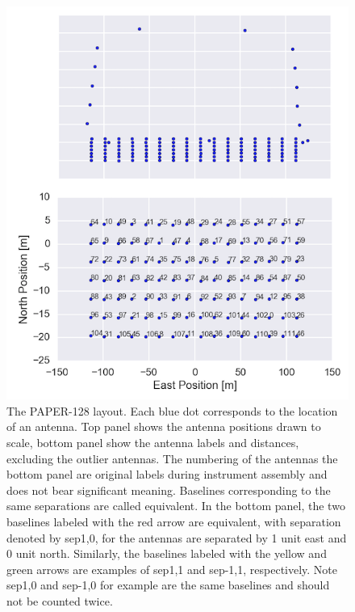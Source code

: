 \documentclass[preprint2,numberedappendix,tighten,twocolappendix]{aastex6}  %
\renewcommand\[{\begin{equation}}
\renewcommand\]{\end{equation}}
\begin{document}
\begin{figure}[H]
\includegraphics[width=\linewidth]{antpos128}

\caption{The PAPER-128 layout. Each blue dot corresponds to the location of
an antenna. Top panel shows the antenna positions drawn to scale,
bottom panel show the antenna labels and distances, excluding the outlier
antennas.\label{fig:AntPos}
The numbering of the antennas the bottom panel are original labels
during instrument assembly and does not bear significant
meaning. Baselines corresponding to the same separations are called
equivalent. In the bottom panel, the two baselines labeled with the
red arrow are equivalent, with separation denoted by sep1,0, for the
antennas are separated by 1 unit east and 0 unit north. Similarly,
the baselines labeled with the yellow and green arrows are examples
of sep1,1 and sep-1,1, respectively. Note sep1,0 and sep-1,0 for example
are the same baselines and should not be counted twice.}

\end{figure}
\end{document}
